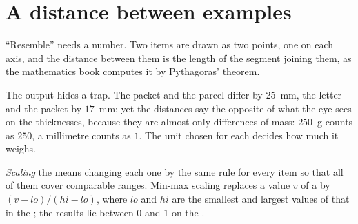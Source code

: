 \section{A distance between examples}\label{sec:g11:k-nearest-neighbours:distance}

``Resemble'' needs a number. Two items are drawn as two points, one  on each axis, and the distance between them
is the length of the segment joining them, as the mathematics book computes it by Pythagoras' theorem.

\label{lst:g11:k-nearest-neighbours:distance}

\label{out:g11:k-nearest-neighbours:distance}

The output hides a trap. The packet and the parcel differ by $25$~mm, the letter and the packet by $17$~mm; yet the
distances say the opposite of what the eye sees on the thicknesses, because they are almost only differences of mass:
$250$~g counts as $250$, a millimetre counts as $1$. The unit chosen for each  decides how much it weighs.

\begin{definition}[Scaling]\label{def:g11:k-nearest-neighbours:scaling}
\emph{Scaling} the  means changing each one by the same rule for every item so that all of them
cover comparable ranges. Min-max scaling replaces a value $v$ of a  by $(v - \mathit{lo}) / (\mathit{hi} -
\mathit{lo})$, where $\mathit{lo}$ and $\mathit{hi}$ are the smallest and largest values of that  in the
; the results lie between $0$ and $1$ on the .
\end{definition}

\label{lst:g11:k-nearest-neighbours:scale}

